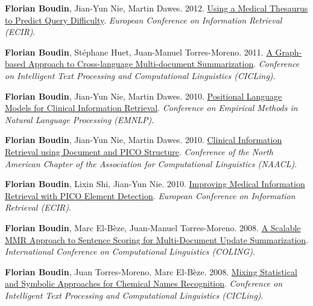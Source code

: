 \item 
\textbf{Florian Boudin}, Jian-Yun Nie, Martin Dawes.
2012.
\href{https://link.springer.com/chapter/10.1007/978-3-642-28997-2_46}{Using a Medical Thesaurus to Predict Query Difficulty}.
\textit{European Conference on Information Retrieval (ECIR)}.
\label{boudin-etal-2012-medical}

\item 
\textbf{Florian Boudin}, Stéphane Huet, Juan-Manuel Torres-Moreno.
2011.
\href{http://polibits.gelbukh.com/2011_43/43_16.pdf}{A Graph-based Approach to Cross-language Multi-document Summarization}.
\textit{Conference on Intelligent Text Processing and Computational Linguistics (CICLing)}.
\label{boudin-etal-2011-graph}

\item 
\textbf{Florian Boudin}, Jian-Yun Nie, Martin Dawes.
2010.
\href{https://aclanthology.org/D10-1011.pdf}{Positional Language Models for Clinical Information Retrieval}.
\textit{Conference on Empirical Methods in Natural Language Processing (EMNLP)}.
\label{boudin-etal-2010-positional}

\item 
\textbf{Florian Boudin}, Jian-Yun Nie, Martin Dawes.
2010.
\href{https://aclanthology.org/N10-1124.pdf}{Clinical Information Retrieval using Document and PICO Structure}.
\textit{Conference of the North American Chapter of the Association for Computational Linguistics (NAACL)}.
\label{boudin-etal-2010-clinical}

\item 
\textbf{Florian Boudin}, Lixin Shi, Jian-Yun Nie.
2010.
\href{https://link.springer.com/chapter/10.1007/978-3-642-12275-0_8}{Improving Medical Information Retrieval with PICO Element Detection}.
\textit{European Conference on Information Retrieval (ECIR)}.
\label{boudin-etal-2010-improving}

\item 
\textbf{Florian Boudin}, Marc El-Bèze, Juan-Manuel Torres-Moreno.
2008.
\href{https://aclanthology.org/C08-2006.pdf}{A Scalable MMR Approach to Sentence Scoring for Multi-Document Update Summarization}.
\textit{International Conference on Computational Linguistics (COLING)}.
\label{boudin-etal-2008-scalable}

\item 
\textbf{Florian Boudin}, Juan Torres-Moreno, Marc El-Bèze.
2008.
\href{https://link.springer.com/chapter/10.1007/978-3-540-78135-6_28}{Mixing Statistical and Symbolic Approaches for Chemical Names Recognition}.
\textit{Conference on Intelligent Text Processing and Computational Linguistics (CICLing)}.
\label{boudin-etal-2008-mixing}

